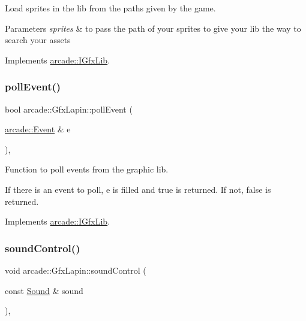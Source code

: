Load sprites in the lib from the paths given by the game. 


\begin{DoxyParams}{Parameters}
{\em sprites} & to pass the path of your sprites to give your lib the way to search your assets \\
\hline
\end{DoxyParams}


Implements \hyperlink{classarcade_1_1_i_gfx_lib_ad5b301c8ff56c428971a2a006514b709}{arcade\+::\+I\+Gfx\+Lib}.

\mbox{\label{classarcade_1_1_gfx_lapin_a80f4cae576f05ddc8ab94d5a348226c5}} 
\subsubsection{\texorpdfstring{poll\+Event()}{pollEvent()}}
{\footnotesize\ttfamily bool arcade\+::\+Gfx\+Lapin\+::poll\+Event (\begin{DoxyParamCaption}\item[{\hyperlink{structarcade_1_1_event}{arcade\+::\+Event} \&}]{e }\end{DoxyParamCaption})\hspace{0.3cm}{\ttfamily [override]}, {\ttfamily [virtual]}}



Function to poll events from the graphic lib. 

If there is an event to poll, e is filled and true is returned. If not, false is returned. 

Implements \hyperlink{classarcade_1_1_i_gfx_lib_a82cdd82f168ca898ef81edf82ca6147a}{arcade\+::\+I\+Gfx\+Lib}.

\mbox{\label{classarcade_1_1_gfx_lapin_ad0f1a1014b88cf7f51ea85ab99e0c87b}} 
\subsubsection{\texorpdfstring{sound\+Control()}{soundControl()}}
{\footnotesize\ttfamily void arcade\+::\+Gfx\+Lapin\+::sound\+Control (\begin{DoxyParamCaption}\item[{const \hyperlink{structarcade_1_1_sound}{Sound} \&}]{sound }\end{DoxyParamCaption})\hspace{0.3cm}{\ttfamily [override]}, {\ttfamily [virtual]}}



